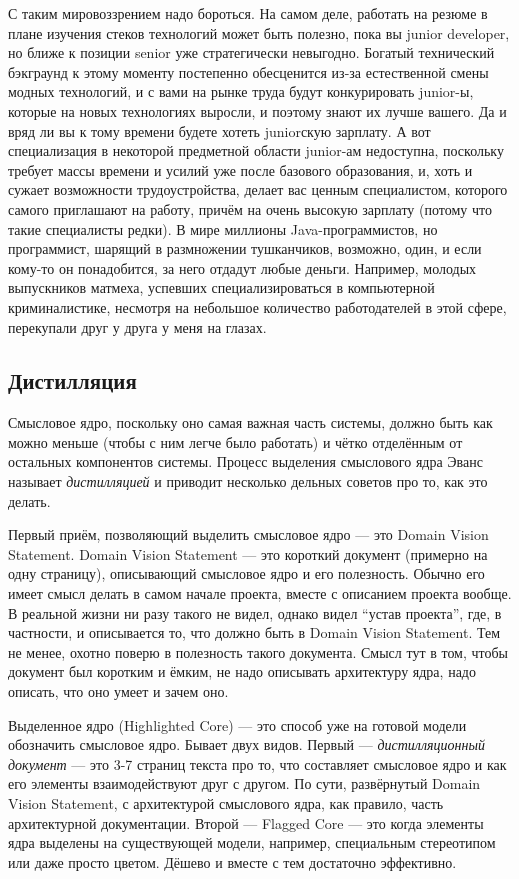 \documentclass[a5paper]{article}
\begin{document}
С таким мировоззрением надо бороться. На самом деле, работать на резюме в плане изучения стеков технологий может быть полезно, пока вы junior developer, но ближе к позиции senior уже стратегически невыгодно. Богатый технический бэкграунд к этому моменту постепенно обесценится из-за естественной смены модных технологий, и с вами на рынке труда будут конкурировать junior-ы, которые на новых технологиях выросли, и поэтому знают их лучше вашего. Да и вряд ли вы к тому времени будете хотеть juniorскую зарплату. А вот специализация в некоторой предметной области junior-ам недоступна, поскольку требует массы времени и усилий уже после базового образования, и, хоть и сужает возможности трудоустройства, делает вас ценным специалистом, которого самого приглашают на работу, причём на очень высокую зарплату (потому что такие специалисты редки). В мире миллионы Java-программистов, но программист, шарящий в размножении тушканчиков, возможно, один, и если кому-то он понадобится, за него отдадут любые деньги. Например, молодых выпускников матмеха, успевших специализироваться в компьютерной криминалистике, несмотря на небольшое количество работодателей в этой сфере, перекупали друг у друга у меня на глазах.

\subsection{Дистилляция}

Смысловое ядро, поскольку оно самая важная часть системы, должно быть как можно меньше (чтобы с ним легче было работать) и чётко отделённым от остальных компонентов системы. Процесс выделения смыслового ядра Эванс называет \textit{дистилляцией} и приводит несколько дельных советов про то, как это делать.

Первый приём, позволяющий выделить смысловое ядро --- это Domain Vision Statement. Domain Vision Statement --- это короткий документ (примерно на одну страницу), описывающий смысловое ядро и его полезность. Обычно его имеет смысл делать в самом начале проекта, вместе с описанием проекта вообще. В реальной жизни ни разу такого не видел, однако видел ``устав проекта'', где, в частности, и описывается то, что должно быть в Domain Vision Statement. Тем не менее, охотно поверю в полезность такого документа. Смысл тут в том, чтобы документ был коротким и ёмким, не надо описывать архитектуру ядра, надо описать, что оно умеет и зачем оно.

Выделенное ядро (Highlighted Core) --- это способ уже на готовой модели обозначить смысловое ядро. Бывает двух видов. Первый --- \textit{дистилляционный документ} --- это 3-7 страниц текста про то, что составляет смысловое ядро и как его элементы взаимодействуют друг с другом. По сути, развёрнутый Domain Vision Statement, с архитектурой смыслового ядра, как правило, часть архитектурной документации. Второй --- Flagged Core --- это когда элементы ядра выделены на существующей модели, например, специальным стереотипом или даже просто цветом. Дёшево и вместе с тем достаточно эффективно.
\end{document}
